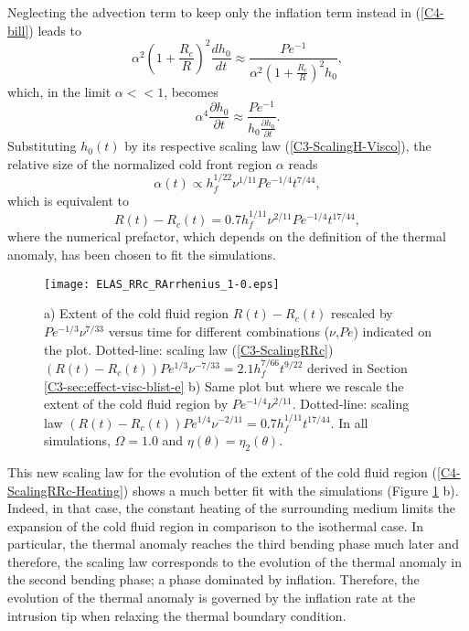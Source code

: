 Neglecting the advection term to  keep only the inflation term instead
in (\ref{C4-bill}) leads to
\begin{equation}
  \alpha^2\left(1+\frac{R_c}{R}\right)^2\frac{d h_0}{d
    t}\approx \frac{Pe^{-1}}{\alpha^2\left(1+\frac{R_c}{R}\right)^2h_0},
\end{equation}
which, in the limit $\alpha<<1$, becomes
\begin{equation}
  \alpha^4\frac{\partial h_0}{\partial
    t} \approx \frac{Pe^{-1}}{h_0\frac{\partial h_0}{\partial t}}.
\end{equation}
Substituting    $h_0(t)$    by     its    respective    scaling    law
(\ref{C3-ScalingH-Visco}), the  relative size  of the  normalized cold
front region $\alpha$ reads
\begin{equation}
  \alpha(t) \propto h_f^{1/22}\nu^{1/11}Pe^{-1/4}t^{7/44},
\end{equation}
which is equivalent to
\begin{equation}
  R(t)-R_c(t) = 0.7h_f^{1/11}\nu^{2/11}Pe^{-1/4}t^{17/44},
  \label{C4-ScalingRRc-Heating}
\end{equation}
where the numerical prefactor, which  depends on the definition of the
thermal anomaly, has been chosen to fit the simulations.

\begin{figure}[h!]
  \begin{center}
    \graphicspath{ {/Users/thorey/Documents/These/Projet/Refroidissement/Skin_Model/Figure/Figure_Heating/} }
    \texttt{[image: ELAS\_RRc\_RArrhenius\_1-0.eps]}
    \caption{a) Extent of the cold fluid region $R(t)-R_c(t)$ rescaled
      by $Pe^{-1/3}\nu^{7/33}$ versus  time for different combinations
      ($\nu$,$Pe$) indicated  on the  plot.  Dotted-line:  scaling law
      (\ref{C3-ScalingRRc})
      $(R(t)-R_c(t))Pe^{1/3}\nu^{-7/33}=    2.1    h_f^{7/66}t^{9/22}$
      derived in Section \ref{C3-sec:effect-visc-blist-e} b) Same plot
      but where  we rescale  the extent  of the  cold fluid  region by
      $Pe^{-1/4}\nu^{2/11}$.       Dotted-line:       scaling      law
      $(R(t)-R_c(t))Pe^{1/4}\nu^{-2/11}= 0.7  h_f^{1/11}t^{17/44}$. In
      all           simulations,            $\Omega=1.0$           and
      $\eta(\theta)=\eta_2(\theta)$.}
    \label{C4-ELAS_RRc_RArrhenius_1-0}
  \end{center}
\end{figure}

This new scaling law for the evolution of the extent of the cold fluid
region (\ref{C4-ScalingRRc-Heating}) shows a  much better fit with the
simulations  (Figure \ref{C4-ELAS_RRc_RArrhenius_1-0}  b). Indeed,  in
that case, the  constant heating of the surrounding  medium limits the
expansion of  the cold  fluid region in  comparison to  the isothermal
case. In  particular, the  thermal anomaly  reaches the  third bending
phase much  later and  therefore, the scaling  law corresponds  to the
evolution of the thermal anomaly in  the second bending phase; a phase
dominated  by  inflation.  Therefore,  the  evolution  of the  thermal
anomaly is  governed by the inflation  rate at the intrusion  tip when
relaxing the thermal boundary condition.


